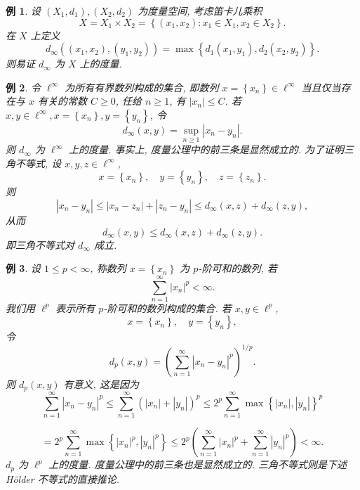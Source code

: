 \documentclass[openany]{ctexbook}
\theoremstyle{kaiti}
\theoremstyle{normal}
\newtheorem{example}{例}[section]
\begin{document}
\begin{example}
  设 $\left(X_1, d_1\right),\left(X_2, d_2\right)$ 为度量空间, 考虑笛卡儿乘积
  $$
  X=X_1 \times X_2=\left\{\left(x_1, x_2\right): x_1 \in X_1, x_2 \in X_2\right\}.
  $$
  在 $X$ 上定义
  $$
  d_{\infty}\left(\left(x_1, x_2\right),\left(y_1, y_2\right)\right)=\max\left\{d_1\left(x_1, y_1\right), d_2\left(x_2, y_2\right)\right\}.
  $$
  则易证 $d_{\infty}$ 为 $X$ 上的度量.
\end{example}

\begin{example}
  令 $\ell^{\infty}$ 为所有有界数列构成的集合, 即数列 $x=\left\{x_n\right\} \in \ell^{\infty}$ 当且仅当存在与 $x$ 有关的常数 $C \geqslant 0$, 任给 $n \geqslant 1$, 有 $\left|x_n\right| \leqslant C$. 若 $x, y \in \ell^{\infty}, x=\left\{x_n\right\}, y=\left\{y_n\right\}$, 令
  $$
  d_{\infty}(x, y)=\sup_{n \geqslant 1}\left|x_n-y_n\right|.
  $$
  则 $d_{\infty}$ 为 $\ell^{\infty}$ 上的度量. 事实上, 度量公理中的前三条是显然成立的. 为了证明三角不等式, 设 $x, y, z \in \ell^{\infty}$,
  $$
  x=\left\{x_n\right\}, \quad y=\left\{y_n\right\}, \quad z=\left\{z_n\right\}.
  $$
  则
  $$
  \left|x_n-y_n\right| \leqslant\left|x_n-z_n\right|+\left|z_n-y_n\right| \leqslant d_{\infty}(x, z)+d_{\infty}(z, y),
  $$
  从而
  $$
  d_{\infty}(x, y) \leqslant d_{\infty}(x, z)+d_{\infty}(z, y).
  $$
  即三角不等式对 $d_{\infty}$ 成立.
\end{example}

\begin{example}
  设 $1 \leqslant p<\infty$, 称数列 $x=\left\{x_n\right\}$ 为 $p$-阶可和的数列, 若
  $$
  \sum_{n=1}^{\infty}\left|x_n\right|^{p}<\infty.
  $$
  我们用 $\ell^{p}$ 表示所有 $p$-阶可和的数列构成的集合. 若 $x, y \in \ell^{p}$,
  $$
  x=\left\{x_n\right\}, \quad y=\left\{y_n\right\},
  $$
  令
  $$
  d_{p}(x, y)=\left(\sum_{n=1}^{\infty}\left|x_n-y_n\right|^{p}\right)^{1 / p}.
  $$
  则 $d_{p}(x, y)$ 有意义, 这是因为
  $$
  \sum_{n=1}^{\infty}\left|x_n-y_n\right|^{p} \leqslant \sum_{n=1}^{\infty}\left(\left|x_n\right|+\left|y_n\right|\right)^{p} \leqslant 2^{p} \sum_{n=1}^{\infty} \max\left\{\left|x_n\right|,\left|y_n\right|\right\}^{p}
  $$

  $$
  =2^{p} \sum_{n=1}^{\infty} \max\left\{\left|x_n\right|^{p},\left|y_n\right|^{p}\right\} \leqslant 2^{p}\left(\sum_{n=1}^{\infty}\left|x_n\right|^{p}+\sum_{n=1}^{\infty}\left|y_n\right|^{p}\right)<\infty.
  $$
  $d_{p}$ 为 $\ell^{p}$ 上的度量. 度量公理中的前三条也是显然成立的. 三角不等式则是下述 Hölder 不等式的直接推论.
\end{example}
\end{document}

